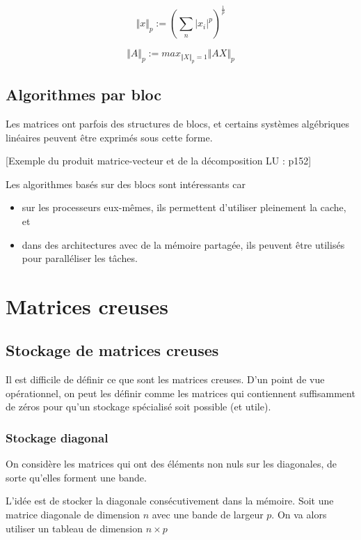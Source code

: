 	$$\Vert x \Vert_p := (\sum_n \vert x_i \vert ^ p)^{\frac{1}{p}}$$
	
	$$\Vert A \Vert_p := max_{\Vert X \Vert_p = 1} \Vert A X \Vert_p$$
	
	\subsection{Algorithmes par bloc}
	
	Les matrices ont parfois des structures de blocs, et certains systèmes algébriques linéaires peuvent être exprimés sous cette forme.
	
	[Exemple du produit matrice-vecteur et de la décomposition LU : p152]
	
	Les algorithmes basés sur des blocs sont intéressants car
	
	\begin{itemize}
		\item sur les processeurs eux-mêmes, ils permettent d'utiliser pleinement la cache, et
		\item dans des architectures avec de la mémoire partagée, ils peuvent être utilisés pour paralléliser les tâches.
	\end{itemize}
	
\section{Matrices creuses}

	\subsection{Stockage de matrices creuses}
	
	Il est difficile de définir ce que sont les matrices creuses. D'un point de vue opérationnel, on peut les définir comme les matrices qui contiennent suffisamment de zéros pour qu'un stockage spécialisé soit possible (et utile).
	
		\subsubsection{Stockage diagonal}
		
		On considère les matrices qui ont des éléments non nuls sur les diagonales, de sorte qu'elles forment une bande.
		
		L'idée est de stocker la diagonale consécutivement dans la mémoire. Soit une matrice diagonale de dimension $n$ avec une bande de largeur $p$. On va alors utiliser un tableau de dimension $n \times p$
		
